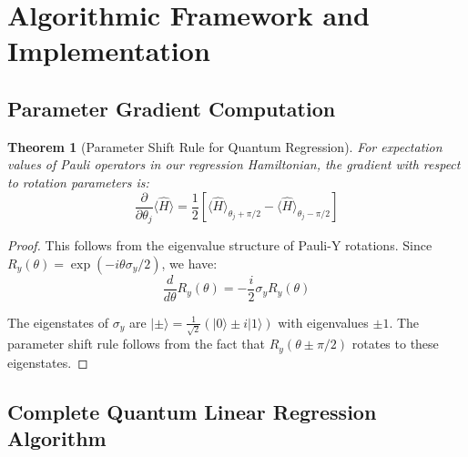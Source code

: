 \documentclass[11pt]{article}
\newtheorem{theorem}{Theorem}[section]
\begin{document}
\section{Algorithmic Framework and Implementation}

\subsection{Parameter Gradient Computation}

\begin{theorem}[Parameter Shift Rule for Quantum Regression]
For expectation values of Pauli operators in our regression Hamiltonian, the gradient with respect to rotation parameters is:
\begin{equation}
\frac{\partial}{\partial \theta_j} \langle \hat{H} \rangle = \frac{1}{2} \left[ \langle \hat{H} \rangle_{\theta_j + \pi/2} - \langle \hat{H} \rangle_{\theta_j - \pi/2} \right]
\label{eq:parameter_shift}
\end{equation}
\end{theorem}

\begin{proof}
This follows from the eigenvalue structure of Pauli-Y rotations. Since $R_y(\theta) = \exp(-i\theta \sigma_y/2)$, we have:
\begin{equation}
\frac{d}{d\theta} R_y(\theta) = -\frac{i}{2} \sigma_y R_y(\theta)
\end{equation}

The eigenstates of $\sigma_y$ are $|\pm\rangle = \frac{1}{\sqrt{2}}(|0\rangle \pm i|1\rangle)$ with eigenvalues $\pm 1$. The parameter shift rule follows from the fact that $R_y(\theta \pm \pi/2)$ rotates to these eigenstates.
\end{proof}

\subsection{Complete Quantum Linear Regression Algorithm}
\end{document}
